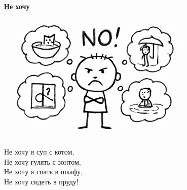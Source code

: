 \vspace*{\fill}
\begin{center}
  {\huge\textbf{Не хочу}}

  \vspace{1.5em}  \includegraphics[width=0.7\textwidth]{pictures/nehochu.png}
  \vspace{4em}
  \parbox{0.6\textwidth}{
    \LARGE
    \begin{spacing}{1.2}
      Не хочу я суп с котом,\\
      Не хочу гулять с зонтом,\\
      Не хочу я спать в шкафу,\\
      Не хочу сидеть в пруду! %
    \end{spacing}
      
  }
\end{center}
\vspace*{\fill}